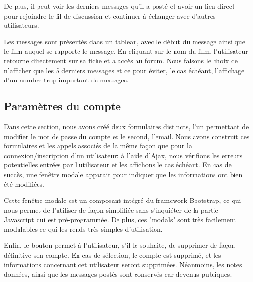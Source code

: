             De plus, il peut voir les derniers messages qu'il a posté et avoir un lien direct pour rejoindre le fil de discussion et continuer à échanger avec d'autres utilisateurs. 

            \smallskip
            Les messages sont présentés dans un tableau, avec le début du message ainsi que le film auquel se rapporte le message. En cliquant sur le nom du film, l'utilisateur retourne directement sur sa fiche et a accès au forum. Nous faisons le choix de n'afficher que les 5 derniers messages et ce pour éviter, le cas échéant, l'affichage d'un nombre trop important de messages.  


        \subsection{Paramètres du compte}

            Dans cette section, nous avons créé deux formulaires distincts, l'un permettant de modifier le mot de passe du compte et le second, l'email. Nous avons construit ces formulaires et les appels associés de la même façon que pour la connexion/inscription d'un utilisateur: à l'aide d'Ajax, nous vérifions les erreurs potentielles entrées par l'utilisateur et les affichons le cas échéant. En cas de succès, une fenêtre modale apparait pour indiquer que les informations ont bien été modifiées.

            \medskip
            Cette fenêtre modale est un composant intégré du framework Bootstrap, ce qui nous permet de l'utiliser de façon simplifiée sans s'inquiéter de la partie Javascript qui est pré-programmée. De plus, ces "modals" sont très facilement modulables ce qui les rends très simples d'utilisation.  

            \medskip
            Enfin, le bouton  permet à l'utilisateur, s'il le souhaite, de supprimer de façon définitive son compte. En cas de sélection, le compte est supprimé, et les informations concernant cet utilisateur seront supprimées. Néanmoins, les notes données, ainsi que les messages postés sont conservés car devenus publiques.